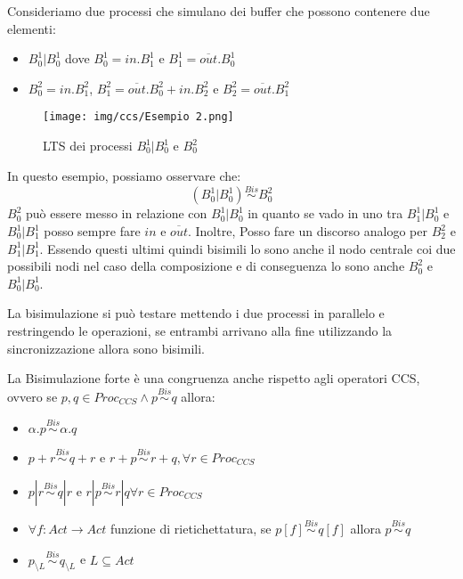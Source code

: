 \begin{esempio}
    Consideriamo due processi che simulano dei buffer che possono contenere due
    elementi:
    \begin{itemize}
        \item $B_0^1 | B_0^1$ dove $B_0^1 = in . B_1^1$ e $B_1^1 =
                  \overline{out} . B_0^1$
        \item $B_0^2 = in . B_1^2$, $B_1^2= \overline{out} . B_0^2 + in
                  . B_2^2$ e $B_2^2 = \overline{out} . B_1^2$
    \end{itemize}
    \begin{figure}[!ht]
        \centering
        \texttt{[image: img/ccs/Esempio 2.png]}
        \caption{LTS dei processi $B_0^1 | B_0^1$ e $B_0^2$}
    \end{figure}
    In questo esempio, possiamo osservare che: $$(B_0^1 | B_0^1) \stackrel{Bis}{\sim} B_0^2$$
    $B_0^2$ può essere messo in relazione con $B_0^1| B_0^1$ in quanto se vado
    in uno tra $B_1^1 | B_0^1$ e $B_0^1 | B_1^1$ posso sempre fare $in$ e $\overline{out}$.
    Inoltre, Posso fare un discorso analogo per $B_2^2$ e $B_1^1 | B_1^1$.
    Essendo questi ultimi quindi bisimili lo sono anche il nodo centrale coi
    due possibili nodi nel caso della composizione e di conseguenza lo sono
    anche $B_0^2$ e $B_0^1 | B_0^1$.
\end{esempio}
La bisimulazione si può testare mettendo i due processi in parallelo e restringendo
le operazioni, se entrambi arrivano alla fine utilizzando la sincronizzazione
allora sono bisimili.
\begin{osservazione}
    La Bisimulazione forte è una congruenza anche rispetto agli operatori CCS,
    ovvero se $p, q \in Proc_{CCS} \land p \stackrel{Bis}{\sim} q$ allora:
    \begin{itemize}
        \item $\alpha.p \stackrel{Bis}{\sim} \alpha.q$
        \item $p + r \stackrel{Bis}{\sim}q + r$ e $r + p \stackrel{Bis}{\sim} r
                  + q, \forall r \in Proc_{CCS}$
        \item $p | r \stackrel{Bis}{\sim} q | r$ e $r | p \stackrel{Bis}{\sim} r | q
                  \forall r \in Proc_{CCS}$
        \item $\forall f: Act \to Act$ funzione di rietichettatura, se $p[f]
                  \stackrel{Bis}{\sim} q[f]$ allora $p \stackrel{Bis}{\sim} q$
        \item $p_{\setminus L} \stackrel{Bis}{\sim} q_{\setminus L}$ e $L \subseteq
                  Act$
    \end{itemize}
\end{osservazione}
